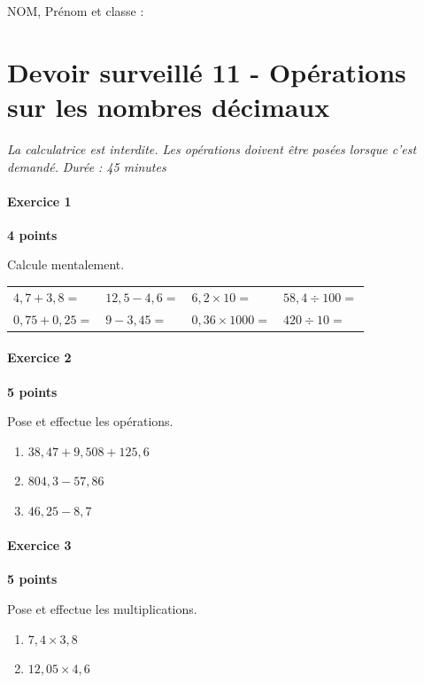 \documentclass[a4paper,10pt]{report}
\begin{document}
\pagestyle{empty}
\noindent NOM, Prénom et classe : \dotfill

\section*{Devoir surveillé 11 - Opérations sur les nombres décimaux}
\noindent\textit{La calculatrice est interdite. Les opérations doivent être posées lorsque c'est demandé.} \hfill \textit{Durée : 45 minutes}

\medskip
\paragraph{Exercice 1} \hfill \textbf{4 points}

\noindent Calcule mentalement.
\begin{center}
\renewcommand{\arraystretch}{1.5}
\begin{tabularx}{\linewidth}{*{4}{X}}
$4,7+3,8=$ & $12,5-4,6=$ & $6,2\times 10=$ & $58,4\div 100=$\\
$0,75+0,25=$ & $9-3,45=$ & $0,36\times 1000=$ & $420\div 10=$
\end{tabularx}
\end{center}

\medskip
\paragraph{Exercice 2} \hfill \textbf{5 points}

\noindent Pose et effectue les opérations.
\begin{enumerate}
\item $38,47+9,508+125,6$
\item $804,3-57,86$
\item $46,25-8,7$
\end{enumerate}

\medskip\noindent\grandscarreaux{\linewidth}{6cm}

\medskip
\paragraph{Exercice 3} \hfill \textbf{5 points}

\noindent Pose et effectue les multiplications.
\begin{enumerate}
\item $7,4\times 3,8$
\item $12,05\times 4,6$
\end{enumerate}
\end{document}
